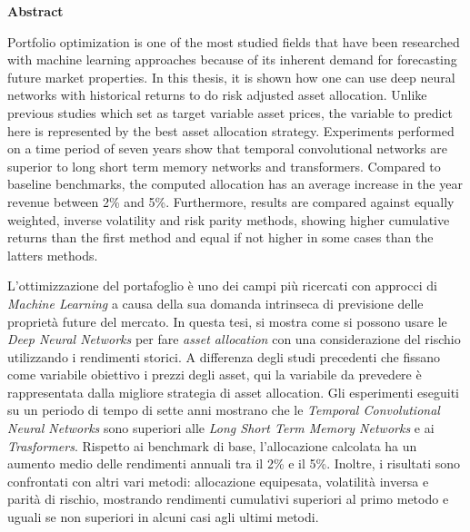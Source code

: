 \documentclass[12pt,a4paper]{book}
\begin{document}
    
    
    
    \newpage
    
    \thispagestyle{plain}
    \begin{center}
    \textbf{Abstract}
    \end{center}
Portfolio optimization is one of the most studied fields that have been researched with machine learning approaches because of its inherent demand for forecasting future market properties. In this thesis, it is shown how one can use deep neural networks with historical returns to do risk adjusted asset allocation. Unlike previous studies which set as target variable asset prices, the variable to predict here is represented by the best asset allocation strategy. Experiments performed on a time period of seven years show that temporal convolutional networks are superior to long short term memory networks and transformers. Compared to baseline benchmarks, the computed allocation has an average increase in the year revenue between 2\% and 5\%. Furthermore, results are compared against equally weighted, inverse volatility and risk parity methods, showing higher cumulative returns than the first method and equal if not higher in some cases than the latters methods.

\vspace{3em}

L'ottimizzazione del portafoglio è uno dei campi più ricercati con approcci di \textit{Machine Learning} a causa della sua domanda intrinseca di previsione delle proprietà future del mercato. In questa tesi, si mostra come si possono usare le \textit{Deep Neural Networks} per fare \textit{asset allocation} con una considerazione del rischio utilizzando i rendimenti storici.  A differenza degli studi precedenti che fissano come variabile obiettivo i prezzi degli asset, qui la variabile da prevedere è rappresentata dalla migliore strategia di asset allocation. Gli esperimenti eseguiti su un periodo di tempo di sette anni mostrano che le \textit{Temporal Convolutional Neural Networks} sono superiori alle \textit{Long Short Term Memory Networks} e ai \textit{Trasformers}. Rispetto ai benchmark di base, l'allocazione calcolata ha un aumento medio delle rendimenti annuali tra il 2\% e il 5\%. Inoltre, i risultati sono confrontati con altri vari metodi: allocazione equipesata, volatilità inversa e parità di rischio, mostrando rendimenti cumulativi superiori al primo metodo e uguali se non superiori in alcuni casi agli ultimi metodi.
\end{document}
